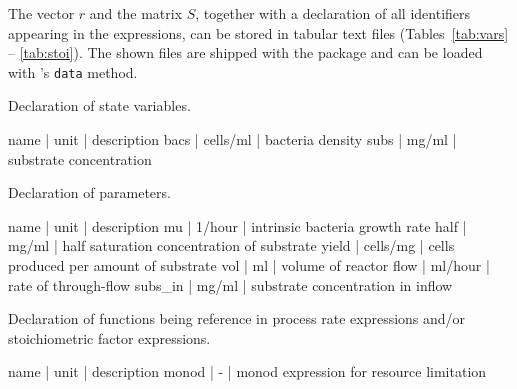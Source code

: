 \documentclass[onecolumn]{article}
\begin{document}
The vector $r$ and the matrix $S$, together with a declaration of all identifiers appearing in the expressions, can be stored in tabular text files (Tables~\ref{tab:vars} -- \ref{tab:stoi}). The shown files are shipped with the package and can be loaded with 's \verb|data| method.

\begin{table}[p]
\caption{Declaration of state variables. \label{tab:vars}}
\begin{shaded}\begin{small}
\begin{Schunk}
\begin{Soutput}
 name |     unit |             description
 bacs | cells/ml | bacteria density       
 subs | mg/ml    | substrate concentration
\end{Soutput}
\end{Schunk}
\end{small}\end{shaded}
\end{table}

\begin{table}[p]
\caption{Declaration of parameters. \label{tab:pars}}
\begin{shaded}\begin{small}
\begin{Schunk}
\begin{Soutput}
    name |     unit |                                description
 mu      | 1/hour   | intrinsic bacteria growth rate            
 half    | mg/ml    | half saturation concentration of substrate
 yield   | cells/mg | cells produced per amount of substrate    
 vol     | ml       | volume of reactor                         
 flow    | ml/hour  | rate of through-flow                      
 subs_in | mg/ml    | substrate concentration in inflow         
\end{Soutput}
\end{Schunk}
\end{small}\end{shaded}
\end{table}

\begin{table}[p]
\caption{Declaration of functions being reference in process rate expressions and/or stoichiometric factor expressions. \label{tab:funs}}
\begin{shaded}\begin{small}
\begin{Schunk}
\begin{Soutput}
  name | unit |                              description
 monod |    - | monod expression for resource limitation
\end{Soutput}
\end{Schunk}
\end{small}\end{shaded}
\end{table}
\end{document}
